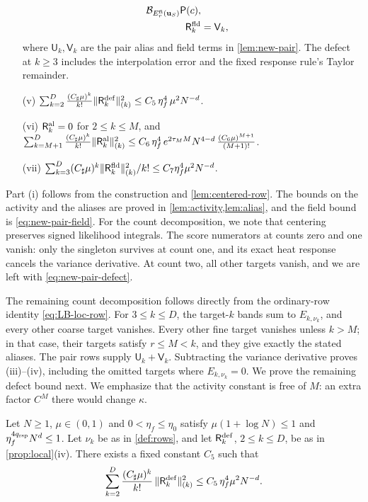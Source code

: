 \begin{proposition}
\begin{enumerate}
\begin{align*}
 \mathcal B_{E_r^{\rm fi}(\mathbf u_S)}\mathsf P(c),\\
 \mathsf R_k^{\rm fld}&=\mathsf V_k,
\end{align*}
where $\mathsf U_k,\mathsf V_k$ are the pair alias and field terms
in \cref{lem:new-pair}. The defect at $k\ge3$ includes the
interpolation error and the fixed response rule's Taylor remainder.
\item[\textup{(v)}] $\sum_{k=2}^D\frac{(C_\sharp\mu)^k}{k!}
\lVert\mathsf R_k^{\rm def}\rVert_{(k)}^2\le C_5\,\eta_f^4\,\mu^2N^{-d}$.
\item[\textup{(vi)}] $\mathsf R_k^{\rm al}=0$ for $2\le k\le M$, and
$\sum_{k=M+1}^D\frac{(C_\sharp\mu)^k}{k!}
\lVert\mathsf R_k^{\rm al}\rVert_{(k)}^2
\le C_6\,\eta_f^4\,e^{2\tau_MM}N^{4-d}\,\frac{(C_6\mu)^{M+1}}{(M+1)!}$.
\item[\textup{(vii)}]
$\sum_{k=3}^D(C_\sharp\mu)^k\|\mathsf R_k^{\rm fld}\|_{(k)}^2/k!
\le C_7\eta_f^4\mu^2N^{-d}$.
\end{enumerate}
\end{proposition}

Part (i) follows from the construction and \cref{lem:centered-row}.
The bounds on the activity and the aliases are proved in
\cref{lem:activity,lem:alias}, and the field bound is
\eqref{eq:new-pair-field}. For the count decomposition, we note that
centering preserves signed likelihood integrals. The score numerators at counts zero and one
vanish: only the singleton survives at count one, and its exact heat
response cancels the variance derivative. At count two, all other
targets vanish, and we are left with \eqref{eq:new-pair-defect}.

The remaining count decomposition follows directly from the
ordinary-row identity \eqref{eq:LB-loc-row}.
For $3\le k\le D$, the target-$k$ bands sum to $E_{k,\nu_k}$, and every
other coarse target vanishes. Every other fine target vanishes unless $k>M$; in
that case, their targets satisfy $r\le M<k$, and they give exactly the
stated aliases. The pair rows supply $\mathsf U_k+\mathsf V_k$.
Subtracting the variance derivative proves (iii)--(iv), including the
omitted targets where $E_{k,\nu_k}=0$.
We prove the remaining defect bound next. We emphasize that the activity
constant is free of $M$: an extra factor $C^M$ there would change
$\kappa$.

\begin{lemma}\label{lem:defect}
Let $N\ge1$, $\mu\in(0,1)$ and $0<\eta_f\le\eta_0$ satisfy
$\mu(1+\log N)\le1$ and $\eta_f^{4q_{\rm rsp}}N^d\le1$.
Let $\nu_k$ be as in \eqref{def:rows}, and let
$\mathsf R^{\rm def}_k$, $2\le k\le D$, be as in \cref{prop:local}(iv).
There exists a fixed constant $C_5$ such that
\[
 \sum_{k=2}^D\frac{(C_\sharp\mu)^k}{k!}\,
 \lVert\mathsf R^{\rm def}_k\rVert_{(k)}^2
 \le C_5\,\eta_f^4\mu^2N^{-d}.
\]
\end{lemma}

